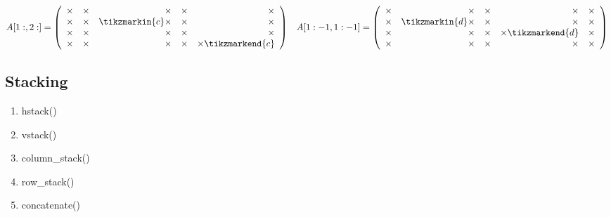 \begin{align*}
A[1:,2:] = \left(\begin{array}{rrrrr}
\times & \times & \times & \times & \times\\
\times & \times & \tikzmarkin{c}\times & \times & \times\\
\times & \times & \times & \times & \times\\
\times & \times & \times & \times & \times\tikzmarkend{c}
\end{array}\right)
&&
A[1:-1,1:-1] = \left(\begin{array}{rrrrr}
\times & \times & \times & \times & \times\\
\times & \tikzmarkin{d} \times & \times & \times & \times\\
\times & \times & \times & \times \tikzmarkend{d} & \times\\
\times & \times & \times & \times & \times\end{array}\right)
\end{align*}

\subsection*{Stacking}

\begin{enumerate}
\item hstack()
\item vstack()
\item column\_stack()
\item row\_stack()
\item concatenate()
\end{enumerate}




